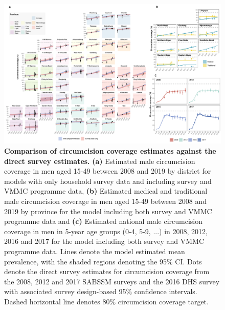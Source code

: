 \documentclass{article}
\begin{document}
\begin{landscape}
    \begin{figure}[H]
  \centering
  \includegraphics[width = 0.8\linewidth]{Figures/paper/Figure1.pdf}
  \caption{{\bf Comparison of circumcision coverage estimates against the direct survey estimates.} {\bf(a)} Estimated male circumcision coverage in men aged 15-49 between 2008 and 2019 by district for models with only household survey data and including survey and VMMC programme data, {\bf(b)} Estimated medical and traditional male circumcision coverage in men aged 15-49 between 2008 and 2019 by province for the model including both survey and VMMC programme data and {\bf(c)} Estimated national male circumcision coverage in men in 5-year age groups (0-4, 5-9, ...) in 2008, 2012, 2016 and 2017 for the model including both survey and VMMC programme data. Lines denote the model estimated mean prevalence, with the shaded regions denoting the 95\% CI. Dots denote the direct survey estimates for circumcision coverage from the 2008, 2012 and 2017 SABSSM surveys and the 2016 DHS survey with associated survey design-based 95\% confidence intervals. Dashed horizontal line denotes 80\% circumcision coverage target.}
  \label{fig::comparison}
\end{figure}
\end{landscape}

\end{document}
